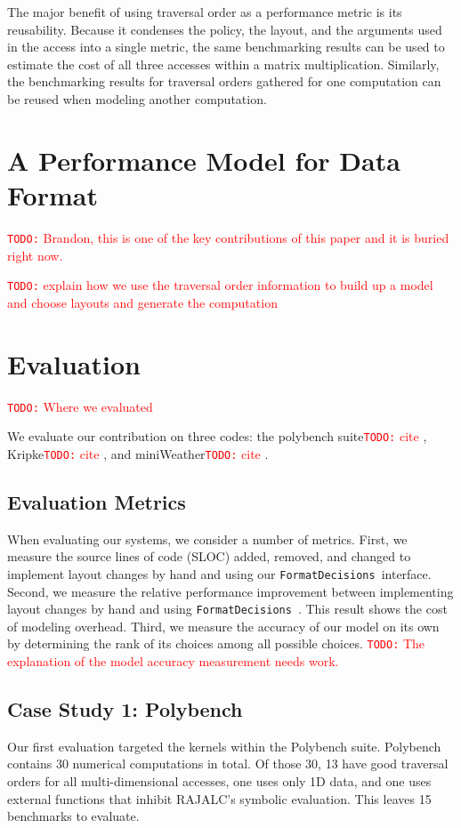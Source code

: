 \documentclass[sigconf, table]{acmart}
\newcommand{\todo}[1]{{\textcolor{red}{{\tt{TODO:}}\,\,#1 }}}
\newcommand{\nc}[0]{\todo{cite}}
\newcommand{\FormatDecisions}[0]{{\texttt{FormatDecisions}}~}
\begin{document}
The major benefit of using traversal order as a performance metric is its reusability. 
Because it condenses the policy, the layout, and the arguments used in the access into a single metric, the same benchmarking results can be used to estimate the cost of all three accesses within a matrix multiplication. 
Similarly, the benchmarking results for traversal orders gathered for one computation can be reused when modeling another computation.

\section{A Performance Model for Data Format}
\todo{Brandon, this is one of the key contributions of this paper and it is buried right now.}

\todo{explain how we use the traversal order information to build up a model and choose layouts and generate the computation}

\section{Evaluation}

\todo{Where we evaluated}

We evaluate our contribution on three codes: the polybench suite\nc, Kripke\nc, and miniWeather\nc.


\subsection{Evaluation Metrics}
When evaluating our systems, we consider a number of metrics. 
First,  we measure the source lines of code (SLOC) added, removed, and changed to implement layout changes by hand and using our \FormatDecisions interface.
Second, we measure the relative performance improvement between implementing layout changes by hand and using \FormatDecisions. 
This result shows the cost of modeling overhead.
Third, we measure the accuracy of our model on its own by determining the rank of its choices among all possible choices.
\todo{The explanation of the model accuracy measurement needs work.} 

\subsection{Case Study 1: Polybench}

Our first evaluation targeted the kernels within the Polybench suite. 
Polybench contains 30 numerical computations in total. 
Of those 30, 13 have good traversal orders for all multi-dimensional accesses, one uses only 1D data, and one uses external functions that inhibit RAJALC's symbolic evaluation.
This leaves 15 benchmarks to evaluate.
\end{document}
